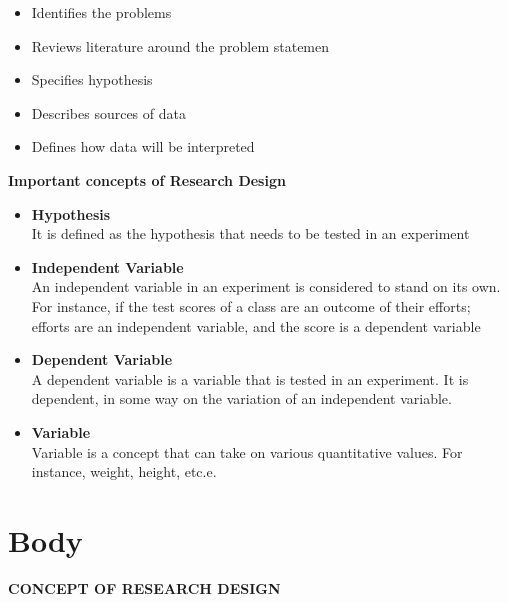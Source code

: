 \documentclass[conference]{IEEEtran}
\begin{document}
\begin{itemize} 
	\item Identifies the problems \\
	\item Reviews literature around the problem statemen \\
	\item Specifies hypothesis \\
	\item Describes sources of data \\
	\item Defines how data will be interpreted \\
		\end{itemize}
 \textbf{ Important concepts of Research Design}
	\begin{itemize}
		
		\item \textbf{Hypothesis} \\
It is defined as the hypothesis that needs to be tested in an experiment\\

		\item \textbf{Independent Variable}\\
An independent variable in an experiment is considered to stand on its own. For instance, if the test scores of a class are an outcome of their efforts; efforts are an independent variable, and the score is a dependent variable\\
		\item \textbf{Dependent Variable}\\
A dependent variable is a variable that is tested in an experiment. It is dependent, in some way on the variation of an independent variable.\\
		\item \textbf{ Variable}\\
Variable is a concept that can take on various quantitative values. For instance, weight, height, etc.e.\\

\end{itemize}
\section{\textbf{Body}}
\textbf{CONCEPT OF RESEARCH DESIGN} \\
\end{document}
